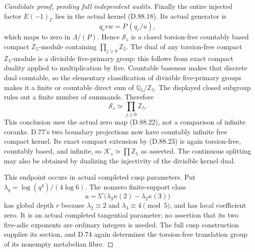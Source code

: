 \begin{proof}[Candidate proof, pending full independent audits]
Finally the entire injected factor \(E(-1)_\Gamma\) lies in
the actual kernel (D.88.18). Its actual generator is
\[
                     q_rvw=P\,(q_r/u),                 \tag{D.88.22}
\]
which maps to zero in \(\Lambda/(P)\). Hence
\(\mathcal S_s\) is a closed torsion-free countably based
compact \(\mathbb Z_5\)-module containing
\(\prod_{j\ge0}\mathbb Z_5\). The dual of any torsion-free
compact \(\mathbb Z_5\)-module is a divisible five-primary
group: this follows from exact compact duality applied to
multiplication by five. Countable baseness makes that discrete
dual countable, so the elementary classification of divisible
five-primary groups makes it a finite or countable direct sum
of \(\mathbb Q_5/\mathbb Z_5\). The displayed closed subgroup
rules out a finite number of summands. Therefore
\[
                    \mathcal S_s\simeq\prod_{j\ge0}\mathbb Z_5.
                                                               \tag{D.88.23}
\]
This conclusion uses the actual zero map (D.88.22), not a
comparison of infinite coranks. D.77's two boundary projections
now have countably infinite free compact kernel. Its exact
compact extension by (D.88.23) is again torsion-free, countably
based, and infinite, so \(\mathcal K_s\simeq\prod\mathbb Z_5\)
as asserted. The continuous splitting may also be obtained by
dualizing the injectivity of the divisible kernel dual.

This endpoint occurs in actual completed cusp parameters. Put
\(\lambda_q=\log(q^4)/(4\log6)\). The nonzero finite-support
class
\[
          a=5^r\bigl(\lambda_3\kappa(2)
                         -\lambda_2\kappa(3)\bigr)    \tag{D.88.24}
\]
has global depth \(r\) because \(\lambda_2\equiv2\) and
\(\lambda_3\equiv4\pmod5\), and has local coefficient zero.
It is an actual completed tangential parameter; no assertion
that its two five-adic exponents are ordinary integers is needed.
The full cusp construction supplies its section, and D.74
again determines the torsion-free translation group of its
nonempty metabelian fibre.
\end{proof}
